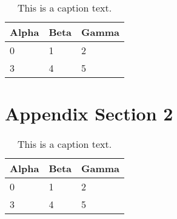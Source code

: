 \Blindtext[1][1]

\begin{table}[h]
	\begin{tabularx}{\textwidth}{X | X | X}
		Alpha		& Beta			& Gamma			\\ \hline
		0			& 1				& 2				\\ \hline
		3			& 4				& 5				\\ %
	\end{tabularx}
	\label{tab:table1}
	\caption{This is a caption text.}
\end{table}

\section{Appendix Section 2}
\label{sec:appendix:sec2}

\Blindtext[1][1]

\begin{table}[h]
	\begin{tabularx}{\textwidth}{X | X | X}
		Alpha		& Beta			& Gamma			\\ \hline
		0			& 1				& 2				\\ \hline
		3			& 4				& 5				\\ %
	\end{tabularx}
	\label{tab:table2}
	\caption{This is a caption text.}
\end{table}

\Blindtext[1][2]
